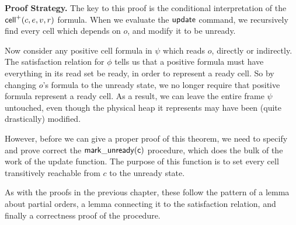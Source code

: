 \textbf{Proof Strategy.} The key to this proof is the conditional
interpretation of the $\mathsf{cell}^{+}({c}, {e}, {v}, {r})$ formula. When we evaluate
the $\mathsf{update}$ command, we recursively find every cell which
depends on $o$, and modify it to be unready.

Now consider any positive cell formula in $\psi$ which reads $o$,
directly or indirectly. The satisfaction relation for $\phi$ tells us
that a positive formula must have everything in its read set be ready,
in order to represent a ready cell. So by changing $o$'s formula to
the unready state, we no longer require that positive formula
represent a ready cell. As a result, we can leave the entire frame
$\psi$ untouched, even though the physical heap it represents may have
been (quite drastically) modified.

However, before we can give a proper proof of this theorem, we need to
specify and prove correct the $\mathsf{mark\_unready(c)}$ procedure,
which does the bulk of the work of the update function. The purpose of
this function is to set every cell transitively reachable from $c$ to
the unready state.

As with the proofs in the previous chapter, these follow the pattern 
of a lemma about partial orders, a lemma connecting it to the satisfaction
relation, and finally a correctness proof of the procedure. 


